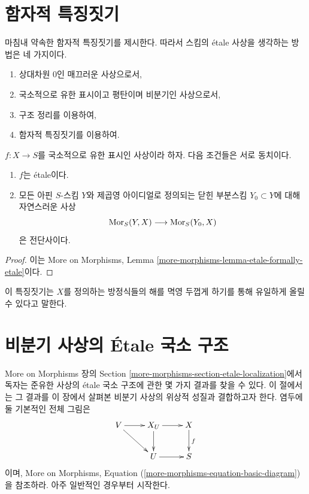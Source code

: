 \section{함자적 특징짓기}
\label{section-functorial-etale}

\noindent
마침내 약속한 함자적 특징짓기를 제시한다.
따라서 스킴의 \'etale 사상을 생각하는 방법은 네 가지이다.
\begin{enumerate}
\item 상대차원 $0$인 매끄러운 사상으로서,
\item 국소적으로 유한 표시이고 평탄이며 비분기인 사상으로서,
\item 구조 정리를 이용하여,
\item 함자적 특징짓기를 이용하여.
\end{enumerate}

\begin{theorem}
\label{theorem-formally-etale}
$f : X \to S$를 국소적으로 유한 표시인 사상이라 하자.
다음 조건들은 서로 동치이다.
\begin{enumerate}
\item $f$는 \'etale이다.
\item 모든 아핀 $S$-스킴 $Y$와 제곱영 아이디얼로 정의되는
닫힌 부분스킴 $Y_0 \subset Y$에 대해 자연스러운 사상
$$
\mathop{\mathrm{Mor}}\nolimits_S(Y, X) \longrightarrow \mathop{\mathrm{Mor}}\nolimits_S(Y_0, X)
$$
은 전단사이다.
\end{enumerate}
\end{theorem}

\begin{proof}
이는 More on Morphisms, Lemma
\ref{more-morphisms-lemma-etale-formally-etale}이다.
\end{proof}

\noindent
이 특징짓기는 $X$를 정의하는 방정식들의 해를 멱영 두껍게 하기를
통해 유일하게 올릴 수 있다고 말한다.




\section{비분기 사상의 \'Etale 국소 구조}
\label{section-unramified-etale-local}

\noindent
More on Morphisms 장의 Section
\ref{more-morphisms-section-etale-localization}에서 독자는 준유한 사상의
\'etale 국소 구조에 관한 몇 가지 결과를 찾을 수 있다. 이 절에서는
그 결과를 이 장에서 살펴본 비분기 사상의 위상적 성질과 결합하고자 한다.
염두에 둘 기본적인 전체 그림은
$$
\xymatrix{
V \ar[r] \ar[dr] & X_U \ar[d] \ar[r] & X \ar[d]^f \\
& U \ar[r] & S
}
$$
이며, More on Morphisms, Equation
(\ref{more-morphisms-equation-basic-diagram})을 참조하라.
아주 일반적인 경우부터 시작한다.

